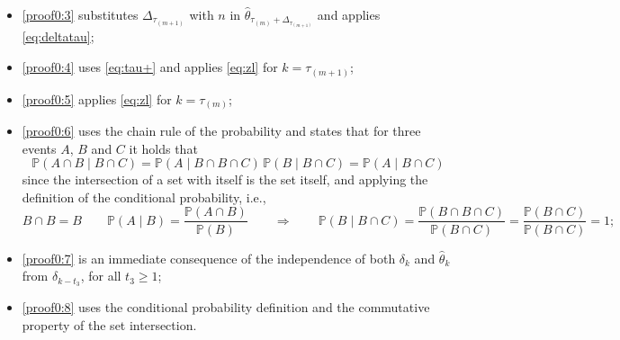 \documentclass[journal,twoside,web]{ieeecolor}
\begin{document}
\begin{figure*}[ht]
\begin{itemize}
\item \eqref{proof0:3} substitutes $\mathit{\Delta}_{\tau_{(m+1)}}$ with $n$ in $\hat{\theta}_{\tau_{(m)}+\mathit{\Delta}_{\tau_{(m+1)}}}$ and applies \eqref{eq:deltatau};
\item \eqref{proof0:4} uses \eqref{eq:tau+} and applies \eqref{eq:zl} for $k=\tau_{(m+1)}$;
\item \eqref{proof0:5} applies \eqref{eq:zl} for $k=\tau_{(m)}$;
\item \eqref{proof0:6} uses the chain rule of the probability and states that for three events $A$, $B$ and $C$ it holds that 
	\begin{equation}\label{eq:chain-rule-special}
		\mathbb{P}(A \cap B \mid B \cap C ) = \mathbb{P}(A \mid B \cap B \cap C ) \, 
		\mathbb{P}(B \mid B \cap C) = \mathbb{P}(A \mid B \cap C)
	\end{equation}
	since the intersection of a set with itself is the set itself, and applying the definition of the conditional probability, i.e.,
	\begin{equation*}
		B\cap B = B \qquad 
		\mathbb{P}(A\mid B)=\frac{\mathbb{P}(A\cap B)}{\mathbb{P}(B)} \qquad
		\Rightarrow \qquad \mathbb{P}(B\mid B\cap C)=
		\frac{\mathbb{P}(B\cap B\cap C)}{\mathbb{P}(B\cap C)} =
		\frac{\mathbb{P}(B\cap C)}{\mathbb{P}(B\cap C)} = 1;
	\end{equation*}
\item \eqref{proof0:7} is an immediate consequence of the independence of both $\delta_{k}$ and $\hat{\theta}_{k}$ from $\delta_{k-t_{3}}$, for all $t_{3}\geq 1$;
\item \eqref{proof0:8} uses the conditional probability definition and the commutative property of the set intersection.%
\end{itemize}
\end{figure*}
\end{document}
